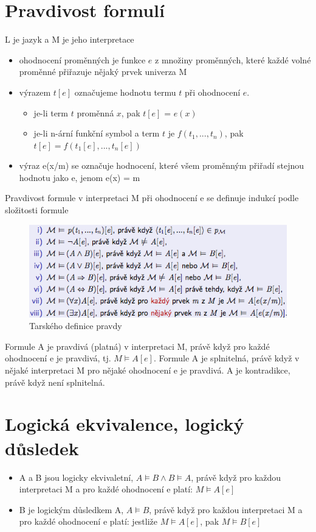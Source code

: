 \documentclass{szzclass}
\begin{document}
\section{Pravdivost formulí}
L je jazyk a M je jeho interpretace
\begin{itemize}
  \item ohodnocení proměnných je funkce $e$ z množiny proměnných, které každé volné proměnné přiřazuje nějaký prvek univerza M
  \item výrazem $t[e]$ označujeme hodnotu termu $t$ při ohodnocení $e$.
  \begin{itemize}
    \item je-li term $t$ proměnná $x$, pak $t[e]$ = $e(x)$
    \item je-li n-ární funkční symbol a term $t$ je $f(t_1,...,t_n)$, pak $t[e] = f(t_1[e],...,t_n[e])$
  \end{itemize}
  \item výraz e(x/m) se označuje hodnocení, které všem proměnným přiřadí stejnou hodnotu jako e, jenom e(x) = m
\end{itemize}
Pravdivost formule v interpretaci M při ohodnocení e se definuje indukcí podle složitosti formule
\begin{figure}[!h]
  \centering
  \includegraphics[width=\textwidth]{topics/bi-spol-15/images/logicalEvaluation.png}
  \caption{Tarského definice pravdy}
\end{figure}
Formule A je pravdivá (platná) v interpretaci M, právě když pro každé ohodnocení e je pravdivá, tj. $M \models A[e]$.
\newline
Formule A je splnitelná, právě když v nějaké interpretaci M pro nějaké ohodnocení e je pravdivá.
\newline
A je kontradikce, právě když není splnitelná.
\section{Logická ekvivalence, logický důsledek}
\begin{itemize}
  \item A a B jsou logicky ekvivaletní, $A \models B \wedge B \models A$, právě když pro každou interpretaci M a pro každé ohodnocení e platí: $M \models A[e]$
  \item B je logickým důsledkem A, $A \models B$, právě když pro každou interpretaci M a pro každé ohodnocení e platí: jestliže $M \models A[e]$, pak $M \models B[e]$
\end{itemize}
\end{document}

